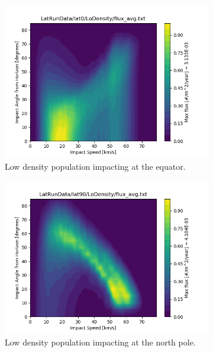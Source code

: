 \documentclass{hitec}
\numberwithin{equation}{section}
\begin{document}
\begin{figure}[h!]
	\begin{subfigure}{.47\textwidth}
		\centering
		\includegraphics[width=.85\linewidth]{../LoDensity018_lat0.png}  
		\caption{Low density population impacting at the equator.}
		\label{fig:sub-LoDensity018_lat0}
	\end{subfigure}
	\begin{subfigure}{.47\textwidth}
		\centering
		\includegraphics[width=.85\linewidth]{../LoDensity036_lat90.png}  
		\caption{Low density population impacting at the north pole.}
		\label{fig:sub-LoDensity036_lat90}
	\end{subfigure}
	\newline
	\begin{subfigure}{.47\textwidth}
		\centering

\end{subfigure}
\end{figure}
\end{document}
